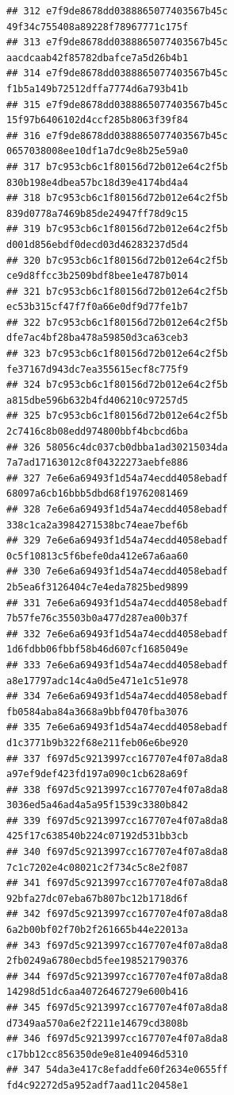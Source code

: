 \documentclass[]{article}
\begin{document}
\begin{verbatim}
## 312 e7f9de8678dd0388865077403567b45c   49f34c755408a89228f78967771c175f
## 313 e7f9de8678dd0388865077403567b45c   aacdcaab42f85782dbafce7a5d26b4b1
## 314 e7f9de8678dd0388865077403567b45c   f1b5a149b72512dffa7774d6a793b41b
## 315 e7f9de8678dd0388865077403567b45c   15f97b6406102d4ccf285b8063f39f84
## 316 e7f9de8678dd0388865077403567b45c   0657038008ee10df1a7dc9e8b25e59a0
## 317 b7c953cb6c1f80156d72b012e64c2f5b   830b198e4dbea57bc18d39e4174bd4a4
## 318 b7c953cb6c1f80156d72b012e64c2f5b   839d0778a7469b85de24947ff78d9c15
## 319 b7c953cb6c1f80156d72b012e64c2f5b   d001d856ebdf0decd03d46283237d5d4
## 320 b7c953cb6c1f80156d72b012e64c2f5b   ce9d8ffcc3b2509bdf8bee1e4787b014
## 321 b7c953cb6c1f80156d72b012e64c2f5b   ec53b315cf47f7f0a66e0df9d77fe1b7
## 322 b7c953cb6c1f80156d72b012e64c2f5b   dfe7ac4bf28ba478a59850d3ca63ceb3
## 323 b7c953cb6c1f80156d72b012e64c2f5b   fe37167d943dc7ea355615ecf8c775f9
## 324 b7c953cb6c1f80156d72b012e64c2f5b   a815dbe596b632b4fd406210c97257d5
## 325 b7c953cb6c1f80156d72b012e64c2f5b   2c7416c8b08edd974800bbf4bcbcd6ba
## 326 58056c4dc037cb0dbba1ad30215034da   7a7ad17163012c8f04322273aebfe886
## 327 7e6e6a69493f1d54a74ecdd4058ebadf   68097a6cb16bbb5dbd68f19762081469
## 328 7e6e6a69493f1d54a74ecdd4058ebadf   338c1ca2a3984271538bc74eae7bef6b
## 329 7e6e6a69493f1d54a74ecdd4058ebadf   0c5f10813c5f6befe0da412e67a6aa60
## 330 7e6e6a69493f1d54a74ecdd4058ebadf   2b5ea6f3126404c7e4eda7825bed9899
## 331 7e6e6a69493f1d54a74ecdd4058ebadf   7b57fe76c35503b0a477d287ea00b37f
## 332 7e6e6a69493f1d54a74ecdd4058ebadf   1d6fdbb06fbbf58b46d607cf1685049e
## 333 7e6e6a69493f1d54a74ecdd4058ebadf   a8e17797adc14c4a0d5e471e1c51e978
## 334 7e6e6a69493f1d54a74ecdd4058ebadf   fb0584aba84a3668a9bbf0470fba3076
## 335 7e6e6a69493f1d54a74ecdd4058ebadf   d1c3771b9b322f68e211feb06e6be920
## 337 f697d5c9213997cc167707e4f07a8da8   a97ef9def423fd197a090c1cb628a69f
## 338 f697d5c9213997cc167707e4f07a8da8   3036ed5a46ad4a5a95f1539c3380b842
## 339 f697d5c9213997cc167707e4f07a8da8   425f17c638540b224c07192d531bb3cb
## 340 f697d5c9213997cc167707e4f07a8da8   7c1c7202e4c08021c2f734c5c8e2f087
## 341 f697d5c9213997cc167707e4f07a8da8   92bfa27dc07eba67b807bc12b1718d6f
## 342 f697d5c9213997cc167707e4f07a8da8   6a2b00bf02f70b2f261665b44e22013a
## 343 f697d5c9213997cc167707e4f07a8da8   2fb0249a6780ecbd5fee198521790376
## 344 f697d5c9213997cc167707e4f07a8da8   14298d51dc6aa40726467279e600b416
## 345 f697d5c9213997cc167707e4f07a8da8   d7349aa570a6e2f2211e14679cd3808b
## 346 f697d5c9213997cc167707e4f07a8da8   c17bb12cc856350de9e81e40946d5310
## 347 54da3e417c8efaddfe60f2634e0655ff   fd4c92272d5a952adf7aad11c20458e1

\end{verbatim}
\end{document}

